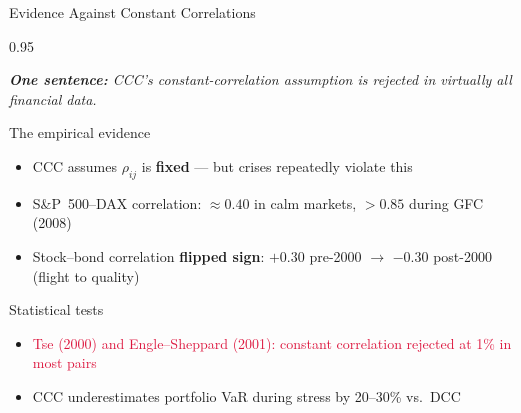 \documentclass[9pt, aspectratio=169, t]{beamer}
\begin{document}
\begin{frame}{Evidence Against Constant Correlations}
    \begin{cminipage}{0.95\textwidth}
    {\footnotesize
    \textit{\textbf{One sentence:} CCC's constant-correlation assumption is rejected in virtually all financial data.}
    \vspace{0.2cm}
    \begin{block}{The empirical evidence}
        \begin{itemize}\setlength{\itemsep}{2pt}
            \item CCC assumes $\rho_{ij}$ is \textbf{fixed} --- but crises repeatedly violate this
            \item S\&P~500--DAX correlation: $\approx 0.40$ in calm markets, $> 0.85$ during GFC (2008)
            \item Stock--bond correlation \textbf{flipped sign}: $+0.30$ pre-2000 $\to$ $-0.30$ post-2000 (flight to quality)
        \end{itemize}
    \end{block}
    \vspace{0.1cm}
    \begin{alertblock}{Statistical tests}
        \begin{itemize}\setlength{\itemsep}{0pt}
            \item \textcolor{Crimson}{Tse (2000) and Engle--Sheppard (2001): constant correlation rejected at 1\% in most pairs}
            \item CCC underestimates portfolio VaR during stress by 20--30\% vs.\ DCC
        \end{itemize}
    \end{alertblock}
    }
    \end{cminipage}
\end{frame}
\end{document}
